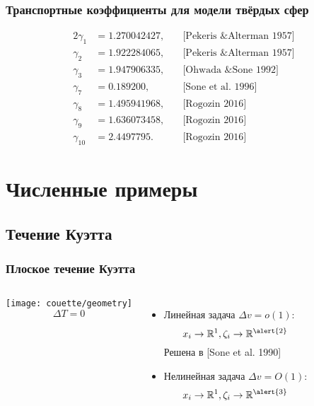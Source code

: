 \documentclass[mathserif]{beamer} %
\newcommand{\OO}[1]{O(#1)}
\begin{document}
\begin{frame}
    \frametitle{Транспортные коэффициенты для модели твёрдых сфер}
    \begin{alignat*}{2}
        \gamma_1 &= 1.270042427, \quad &\text{[Pekeris \& Alterman 1957]} \\
        \gamma_2 &= 1.922284065, \quad &\text{[Pekeris \& Alterman 1957]} \\
        \gamma_3 &= 1.947906335, \quad &\text{[Ohwada \& Sone 1992]} \\
        \gamma_7 &= 0.189200,    \quad &\text{[Sone et al. 1996]} \\
        \gamma_8 &= 1.495941968, \quad &\text{[Rogozin 2016]} \\
        \gamma_9 &= 1.636073458, \quad &\text{[Rogozin 2016]} \\
        \gamma_{10} &= 2.4497795.\quad &\text{[Rogozin 2016]}
    \end{alignat*}
\end{frame}

\section{Численные примеры}
\subsection{Течение Куэтта}

\begin{frame}
    \frametitle{Плоское течение Куэтта}
    \begin{columns}
        \hspace{-10pt}\texttt{[image: couette/geometry]}
        \[\Delta{T} = 0\]
        \begin{itemize}
            \item Линейная задача \(\Delta{v} = o(1)\): \[ x_i\to\mathbb{R}^1, \zeta_i\to\mathbb{R}^{\alert{2}}\]
            Решена в [Sone et al. 1990]
            \bigskip
            \item Нелинейная задача \(\Delta{v} = \OO{1}\): \[ x_i\to\mathbb{R}^1, \zeta_i\to\mathbb{R}^{\alert{3}} \]
        \end{itemize}
    \end{columns}
\end{frame}
\end{document}
